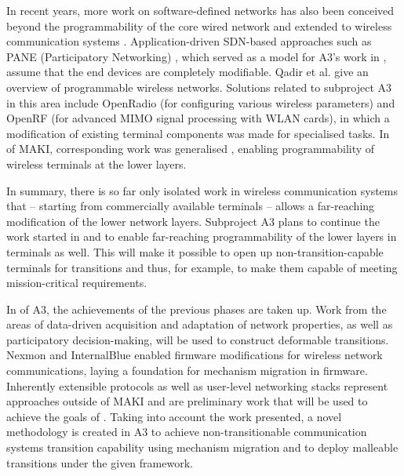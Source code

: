 In recent years, more work on software-defined networks \cite{A3:Kreutz:2015, A3:Monsanto2013} has also been conceived beyond the programmability of the core wired network and extended to wireless communication systems \cite{A3:Bernados:WirelessCommunication, A3:Jagadeesan:2014}. Application-driven SDN-based approaches such as PANE (Participatory Networking) \cite{A3:Ferguson2013}, which served as a model for A3's work in , assume that the end devices are completely modifiable. Qadir et al. \cite{A3:Qadir2014} give an overview of programmable wireless networks. Solutions related to subproject A3 in this area include OpenRadio (for configuring various wireless parameters) and OpenRF (for advanced MIMO signal processing with WLAN cards), in which a modification of existing terminal components was made for specialised tasks.
In  of MAKI, corresponding work was generalised \cite{A3:ScWeHo2018, A3:GrScLiHo2019, A3:ScLiGrHo2018,A3:MaClScHo2019}, enabling programmability of wireless terminals at the lower layers.

In summary, there is so far only isolated work in wireless communication systems that -- starting from commercially available terminals -- allows a far-reaching modification of the lower network layers. Subproject A3 plans to continue the work started in  and to enable far-reaching programmability of the lower layers in terminals as well. This will make it possible to open up non-transition-capable terminals for transitions and thus, for example, to make them capable of meeting mission-critical requirements. 



In  of A3, the achievements of the previous phases are taken up.
Work from the areas of data-driven acquisition and adaptation of network properties, as well as participatory decision-making, will be used to construct deformable transitions. 
Nexmon and InternalBlue enabled firmware modifications for wireless network communications, laying a foundation for mechanism migration in firmware.
Inherently extensible protocols as well as user-level networking stacks represent approaches outside of MAKI and are preliminary work that will be used to achieve the goals of . 
Taking into account the work presented, a novel methodology is created in A3 to achieve non-transitionable communication systems transition capability using mechanism migration and to deploy malleable transitions under the given framework.
